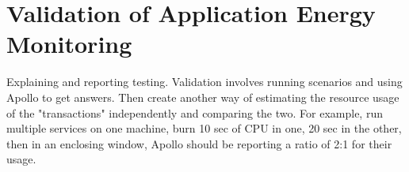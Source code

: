 \chapter{Validation of Application Energy Monitoring}
\label{chapter:validation}

Explaining and reporting testing.  Validation involves running scenarios and using Apollo to get answers.  Then create another way of estimating the resource usage of the "transactions" independently and comparing the two.  For example, run multiple services on one machine, burn 10 sec of CPU in one, 20 sec in the other, then in an enclosing window, Apollo should be reporting a ratio of 2:1 for their usage.
